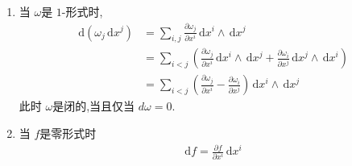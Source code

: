 \documentclass[../../几何与拓扑.tex]{subfiles}
\begin{document}
\begin{remark}
    \begin{enumerate}
        \item 当 $  \omega  $是 $ 1 $-形式时, $$
        \begin{aligned}
        \,\mathrm{d} \left(  \omega _{j} \,\mathrm{d} x^{j} \right)  & = \sum _{i,j} \frac{\partial  \omega _{j}}{\partial x^{i}} \,\mathrm{d} x^{i}\wedge \,\mathrm{d} x^{j}\\ 
         & = \sum _{i<j} \left( \frac{\partial  \omega _{j}}{\partial x^{i}}\,\mathrm{d} x^{i}\wedge \,\mathrm{d} x^{j} +  \frac{\partial  \omega _{i}}{\partial x^{j}}\,\mathrm{d} x^{j}\wedge \,\mathrm{d} x^{i} \right)\\ 
          & = \sum _{i<j} \left( \frac{\partial  \omega _{j}}{\partial x^{i}}- \frac{\partial  \omega_{i} }{\partial x^{j}} \right) \,\mathrm{d}x ^{i}\wedge \,\mathrm{d} x^{j}  
        \end{aligned}
        $$  此时 $  \omega  $是闭的,当且仅当 $ d \omega =0 $.  
        \item 当 $ f $是零形式时 $$
        \begin{aligned}
        \,\mathrm{d} f= \frac{\partial f}{\partial x^{i}} \,\mathrm{d} x^{i} 
        \end{aligned}
        $$  
    \end{enumerate}
    
\end{remark}
\end{document}
